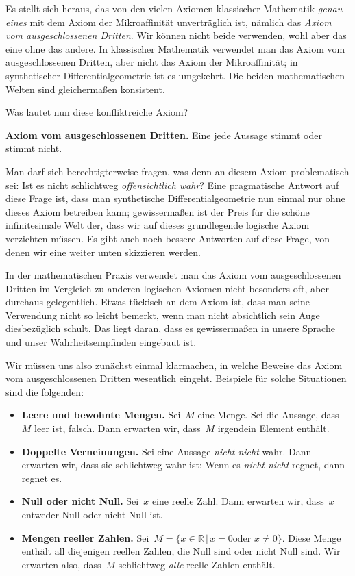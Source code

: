 \documentclass[twoside]{../zirkelblatt}
\newcommand{\RR}{\mathbb{R}}
\theoremstyle{definition}
\theoremstyle{plain}
\theoremstyle{remark}
\begin{document}
Es stellt sich heraus, das von den vielen Axiomen klassischer Mathematik
\emph{genau eines} mit dem Axiom der Mikroaffinität unverträglich ist, nämlich
das \emph{Axiom vom ausgeschlossenen Dritten}. Wir können nicht beide
verwenden, wohl aber das eine ohne das andere. In klassischer Mathematik
verwendet man das Axiom vom ausgeschlossenen Dritten, aber nicht das Axiom der
Mikroaffinität; in synthetischer Differentialgeometrie ist es umgekehrt. Die
beiden mathematischen Welten sind gleichermaßen konsistent.

Was lautet nun diese konfliktreiche Axiom?

\begin{shaded}
\textbf{Axiom vom ausgeschlossenen Dritten.} Eine jede Aussage stimmt oder
stimmt nicht.
\end{shaded}

Man darf sich berechtigterweise fragen, was denn an diesem Axiom problematisch
sei: Ist es nicht schlichtweg \emph{offensichtlich wahr}? Eine pragmatische
Antwort auf diese Frage ist, dass man synthetische Differentialgeometrie nun einmal
nur ohne dieses Axiom betreiben kann; gewissermaßen ist der Preis für die
schöne infinitesimale Welt der, dass wir auf dieses grundlegende logische Axiom
verzichten müssen. Es gibt auch noch bessere Antworten auf diese Frage, von
denen wir eine weiter unten skizzieren werden.

In der mathematischen Praxis verwendet man das Axiom vom ausgeschlossenen
Dritten im Vergleich zu anderen logischen Axiomen nicht besonders oft, aber
durchaus gelegentlich. Etwas tückisch an dem Axiom ist, dass man seine
Verwendung nicht so leicht bemerkt, wenn man nicht absichtlich sein Auge
diesbezüglich schult. Das liegt daran, dass es gewissermaßen in unsere Sprache
und unser Wahrheitsempfinden eingebaut ist.

Wir müssen uns also zunächst einmal klarmachen, in welche Beweise das Axiom vom
ausgeschlossenen Dritten wesentlich eingeht. Beispiele für solche
Situationen sind die folgenden:

\begin{itemize}
\item \textbf{Leere und bewohnte Mengen.} Sei~$M$ eine Menge. Sei die Aussage,
dass~$M$ leer ist, falsch. Dann erwarten wir, dass~$M$ irgendein Element
enthält.
\item \textbf{Doppelte Verneinungen.} Sei eine Aussage \emph{nicht nicht} wahr.
Dann erwarten wir, dass sie schlichtweg wahr ist: Wenn es \emph{nicht nicht}
regnet, dann regnet es.
\item \textbf{Null oder nicht Null.} Sei~$x$ eine reelle Zahl. Dann erwarten wir,
dass~$x$ entweder Null oder nicht Null ist.
\item \textbf{Mengen reeller Zahlen.} Sei~$M = \{ x \in \RR \,|\, \text{$x = 0$
oder $x \neq 0$} \}$. Diese Menge enthält all diejenigen reellen Zahlen, die Null sind
oder nicht Null sind. Wir erwarten also, dass~$M$ schlichtweg \emph{alle}
reelle Zahlen enthält.
\end{itemize}
\end{document}
